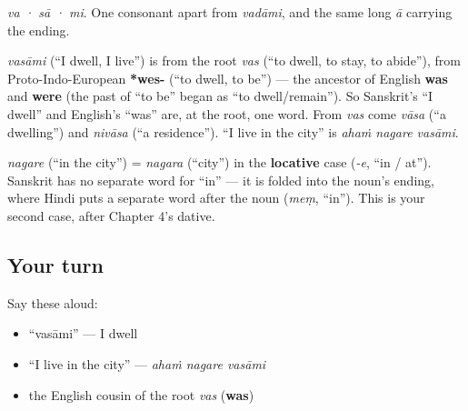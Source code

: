 \begin{sounds}
\emph{va · sā · mi}. One consonant apart from \emph{vadāmi}, and the same long \emph{ā} carrying the ending.
\end{sounds}

\begin{cousinweb}
\emph{vasāmi} (\textquotedblleft{}I dwell, I live\textquotedblright{}) is from the root \emph{vas} (\textquotedblleft{}to dwell, to stay, to abide\textquotedblright{}), from Proto-Indo-European \textbf{*wes-} (\textquotedblleft{}to dwell, to be\textquotedblright{}) — the ancestor of English \textbf{was} and \textbf{were} (the past of \textquotedblleft{}to be\textquotedblright{} began as \textquotedblleft{}to dwell/remain\textquotedblright{}). So Sanskrit's \textquotedblleft{}I dwell\textquotedblright{} and English's \textquotedblleft{}was\textquotedblright{} are, at the root, one word. From \emph{vas} come \emph{vāsa} (\textquotedblleft{}a dwelling\textquotedblright{}) and \emph{nivāsa} (\textquotedblleft{}a residence\textquotedblright{}). \textquotedblleft{}I live in the city\textquotedblright{} is \emph{ahaṁ nagare vasāmi}.
\end{cousinweb}

\begin{grammarlens}[title={Grammar Lens: \textquotedblleft{}in\textquotedblright{} is a case-ending}]
\emph{nagare} (\textquotedblleft{}in the city\textquotedblright{}) = \emph{nagara} (\textquotedblleft{}city\textquotedblright{}) in the \textbf{locative} case (\emph{-e}, \textquotedblleft{}in / at\textquotedblright{}). Sanskrit has no separate word for \textquotedblleft{}in\textquotedblright{} — it is folded into the noun's ending, where Hindi puts a separate word after the noun (\emph{meṃ}, \textquotedblleft{}in\textquotedblright{}). This is your second case, after Chapter 4's dative.
\end{grammarlens}

\subsection*{Your turn}
Say these aloud:

\begin{itemize}
\raggedright
  \item \textquotedblleft{}vasāmi\textquotedblright{} — I dwell
  \item \textquotedblleft{}I live in the city\textquotedblright{} — \emph{ahaṁ nagare vasāmi}
  \item the English cousin of the root \emph{vas} (\textbf{was})
\end{itemize}

